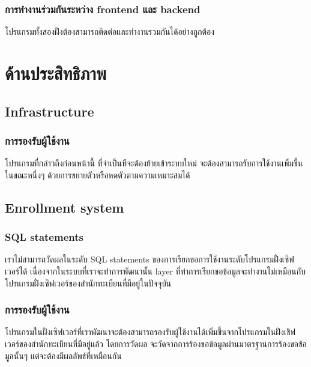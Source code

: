 \subsubsection{การทำงานร่วมกันระหว่าง frontend และ backend}

โปรแกรมทั้งสองฝั่งต้องสามารถติดต่อและทำงานรวมกันได้อย่างถูกต้อง

\section{ด้านประสิทธิภาพ}

\subsection{Infrastructure}

\subsubsection{การรองรับผู้ใช้งาน}

โปรแกรมที่กล่าวถึงก่อนหน้านี้ ที่จำเป็นทีจะต้องย้ายเข้าระบบใหม่ จะต้องสามารถรับการใช้งานเพิ่มขึ้นในขณะหนึ่งๆ ด้วยการขยายตัวหรือหดตัวตามความเหมาะสมได้

\subsection{Enrollment system}

\subsubsection{SQL statements}

เราไม่สามารถวัดผลในระดับ SQL statements ของการเรียกขอการใช้งานระดับโปรแกรมฝั่งเซิฟเวอร์ได้ เนื่องจากในระบบที่เราจะทำการพัฒนานั้น layer ที่ทำการเรียกขอข้อมูลจะทำงานไม่เหมือนกับโปรแกรมฝั่งเซิฟเวอร์ของสำนักทะเบียนที่มีอยู่ในปัจจุบัน

\subsubsection{การรองรับผู้ใช้งาน}

โปรแกรมในฝั่งเซิฟเวอร์ที่เราพัฒนาจะต้องสามารถรองรับผู้ใช้งานได้เพิ่มขึ้นจากโปรแกรมในฝั่งเชิฟเวอร์ของสำนักทะเบียนที่มีอยู่แล้ว โดยการวัดผล จะวัดจากการร้องขอข้อมูลผ่านมาตรฐานการร้องขอข้อมูลนั้นๆ แต่จะต้องมีผลลัพธ์ที่เหมือนกัน

